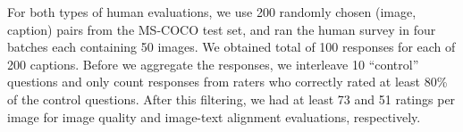 For both types of human evaluations, we use 200 randomly chosen (image, caption) pairs from the MS-COCO test set, and ran the human survey in four batches each containing 50 images. We obtained total of 100 responses for each of 200 captions.
Before we aggregate the responses, we interleave 10 ``control'' questions and only count responses from raters who correctly rated at least 80\% of the control questions. After this filtering, we had at least 73 and 51 ratings per image for image quality and image-text alignment evaluations, respectively.

